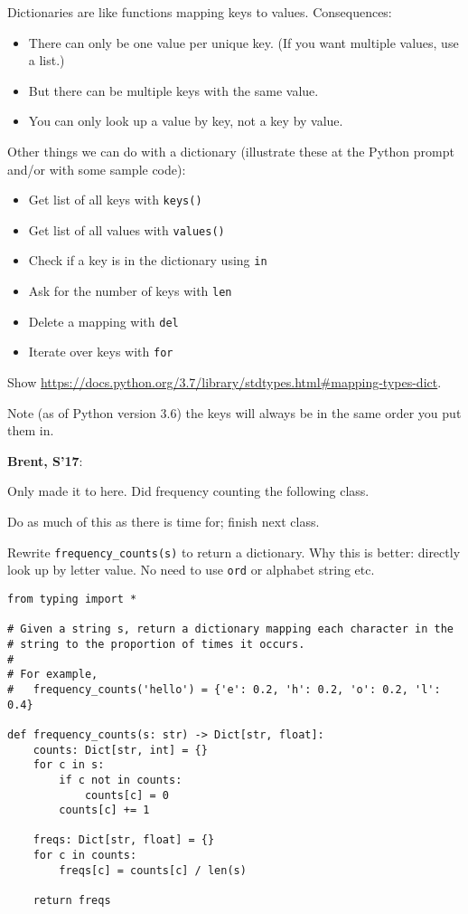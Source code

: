 \documentclass{article}
\newenvironment{reflect}[1]
{
  \noindent
  \begin{lrbox}{\reflectbox}
    \begin{minipage}[t]{\textwidth}
      \textbf{#1}:
}{
    \end{minipage}
  \end{lrbox}
  \fbox{\usebox{\reflectbox}}
}
\begin{document}
Dictionaries are like functions mapping keys to values.  Consequences:
\begin{itemize}
\item There can only be one value per unique key.  (If you want
  multiple values, use a list.)
\item But there can be multiple keys with the same value.
\item You can only look up a value by key, not a key by value.
\end{itemize}

Other things we can do with a dictionary (illustrate these at the
Python prompt and/or with some sample code):
\begin{itemize}
\item Get list of all keys with \verb|keys()|
\item Get list of all values with \verb|values()|
\item Check if a key is in the dictionary using \verb|in|
\item Ask for the number of keys with \verb|len|
\item Delete a mapping with \verb|del|
\item Iterate over keys with \verb|for|
\end{itemize}

Show
\url{https://docs.python.org/3.7/library/stdtypes.html#mapping-types-dict}.

Note (as of Python version 3.6) the keys will always be in the same
order you put them in.

\begin{reflect}{Brent, S'17}
  Only made it to here.  Did frequency counting the following class.
\end{reflect}

Do as much of this as there is time for; finish next class.

Rewrite \verb|frequency_counts(s)| to return a dictionary.  Why this is
better: directly look up by letter value.  No need to use \verb|ord|
or alphabet string etc.

\newpage
\begin{verbatim}
from typing import *

# Given a string s, return a dictionary mapping each character in the
# string to the proportion of times it occurs.
#
# For example,
#   frequency_counts('hello') = {'e': 0.2, 'h': 0.2, 'o': 0.2, 'l': 0.4}

def frequency_counts(s: str) -> Dict[str, float]:
    counts: Dict[str, int] = {}
    for c in s:
        if c not in counts:
            counts[c] = 0
        counts[c] += 1

    freqs: Dict[str, float] = {}
    for c in counts:
        freqs[c] = counts[c] / len(s)

    return freqs
\end{verbatim}
\end{document}
